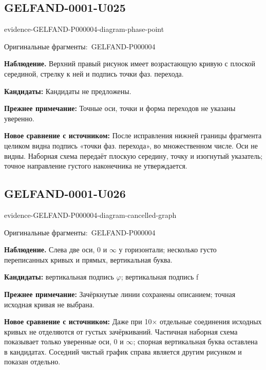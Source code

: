 \documentclass[11pt]{article}
\newcommand{\EvidenceBlock}[4]{%
 \par\smallskip\noindent\begin{minipage}{\linewidth}
 \begin{minipage}[t]{.47\linewidth}\vspace{0pt}\centering
 \csname evidence-#1-#2\endcsname\par
 {\scriptsize\SourceCropCaption\ #1}\par
 \end{minipage}\hfill
 \begin{minipage}[t]{.49\linewidth}\vspace{0pt}\raggedright
 {\small\color{orange!65!black}\textbf{#4} #3}\par
 \end{minipage}
 \end{minipage}\par\smallskip}
\newcommand{\SourceCropCaption}{Оригинальные фрагменты:}\newcommand{\ReadingCaption}{Сомнительное чтение.}\newcommand{\IncompleteCaption}{Неразобранный фрагмент.}\newcommand{\DiagramCaption}{Рисунок и набранное описание.}
\begin{document}
\subsection*{GELFAND-0001-U025}
\EvidenceBlock{GELFAND-P000004}{diagram-phase-point}{Верхний правый рисунок имеет возрастающую кривую с плоской серединой, стрелку к ней и подпись точки фаз. перехода.}{Наблюдение.}
\par\smallskip\noindent\textbf{Кандидаты: } Кандидаты не предложены.\par
\par\smallskip\noindent\textbf{Прежнее примечание: } Точные оси, точки и форма переходов не указаны уверенно.\par
\par\smallskip\noindent\textbf{Новое сравнение с источником: } После исправления нижней границы фрагмента целиком видна подпись «точки фаз. перехода», во множественном числе. Оси не видны. Наборная схема передаёт плоскую середину, точку и изогнутый указатель; точное направление густого наконечника не утверждается.\par

\subsection*{GELFAND-0001-U026}
\EvidenceBlock{GELFAND-P000004}{diagram-cancelled-graph}{Слева две оси, 0 и \(\infty\) у горизонтали; несколько густо переписанных кривых и прямых, вертикальная буква.}{Наблюдение.}
\par\smallskip\noindent\textbf{Кандидаты: } вертикальная подпись \(\varphi\); вертикальная подпись f\par
\par\smallskip\noindent\textbf{Прежнее примечание: } Зачёркнутые линии сохранены описанием; точная исходная кривая не выбрана.\par
\par\smallskip\noindent\textbf{Новое сравнение с источником: } Даже при 10× отдельные соединения исходных кривых не отделяются от густых зачёркиваний. Частичная наборная схема показывает только уверенные оси, 0 и \(\infty\); спорная вертикальная буква оставлена в кандидатах. Соседний чистый график справа является другим рисунком и показан отдельно.\par
\end{document}
